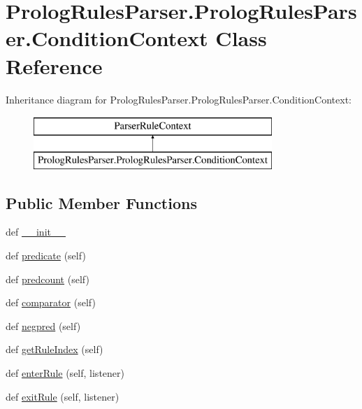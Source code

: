 \hypertarget{class_prolog_rules_parser_1_1_prolog_rules_parser_1_1_condition_context}{}\section{Prolog\+Rules\+Parser.\+Prolog\+Rules\+Parser.\+Condition\+Context Class Reference}
\label{class_prolog_rules_parser_1_1_prolog_rules_parser_1_1_condition_context}
Inheritance diagram for Prolog\+Rules\+Parser.\+Prolog\+Rules\+Parser.\+Condition\+Context\+:\begin{figure}[H]
\begin{center}
\leavevmode
\includegraphics[height=2.000000cm]{class_prolog_rules_parser_1_1_prolog_rules_parser_1_1_condition_context}
\end{center}
\end{figure}
\subsection*{Public Member Functions}
\begin{DoxyCompactItemize}
\item 
def \hyperlink{class_prolog_rules_parser_1_1_prolog_rules_parser_1_1_condition_context_ae03e5d75176f30f9a8e3f70c287386b4}{\+\_\+\+\_\+init\+\_\+\+\_\+}
\item 
def \hyperlink{class_prolog_rules_parser_1_1_prolog_rules_parser_1_1_condition_context_a5c06a75d7e73d08a5dadc35409640503}{predicate} (self)
\item 
def \hyperlink{class_prolog_rules_parser_1_1_prolog_rules_parser_1_1_condition_context_addc4c9c67e6931c4a9cf80e71f593933}{predcount} (self)
\item 
def \hyperlink{class_prolog_rules_parser_1_1_prolog_rules_parser_1_1_condition_context_a0408cfbed4ca8052d500dd20999326f0}{comparator} (self)
\item 
def \hyperlink{class_prolog_rules_parser_1_1_prolog_rules_parser_1_1_condition_context_ad0965075e098339bbca3019598019ead}{negpred} (self)
\item 
def \hyperlink{class_prolog_rules_parser_1_1_prolog_rules_parser_1_1_condition_context_a27db3870e65df7e9c0ccf95d37e81e1d}{get\+Rule\+Index} (self)
\item 
def \hyperlink{class_prolog_rules_parser_1_1_prolog_rules_parser_1_1_condition_context_a1ec4b3cdaf62f4789adca36f5cc255fd}{enter\+Rule} (self, listener)
\item 
def \hyperlink{class_prolog_rules_parser_1_1_prolog_rules_parser_1_1_condition_context_a984b3b6a99946b419c8755271f200b4d}{exit\+Rule} (self, listener)
\end{DoxyCompactItemize}

